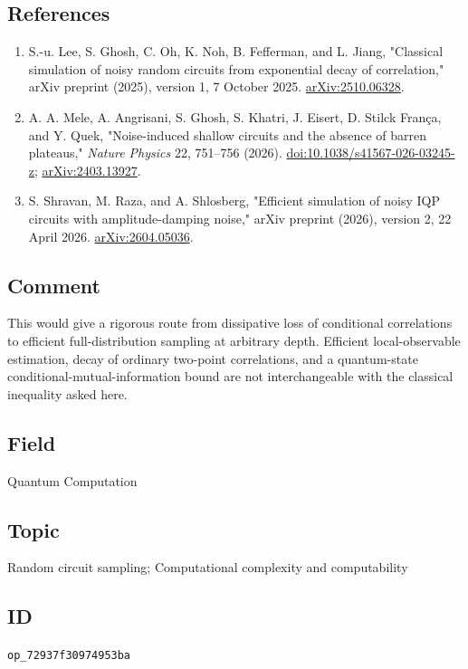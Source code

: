 \subsection*{References}

\begin{enumerate}[label={},leftmargin=4.8em,labelsep=0.5em]
  \footnotesize
  \item[\textup{[Lee25]}]\label{ref:7293-lee25}
  S.-u. Lee, S. Ghosh, C. Oh, K. Noh, B. Fefferman, and L. Jiang, "Classical simulation of noisy random circuits from exponential decay of correlation," arXiv preprint (2025), version 1, 7 October 2025. \href{https://arxiv.org/abs/2510.06328}{arXiv:2510.06328}.

  \item[\textup{[Mele26]}]\label{ref:7293-mele26}
  A. A. Mele, A. Angrisani, S. Ghosh, S. Khatri, J. Eisert, D. Stilck França, and Y. Quek, "Noise-induced shallow circuits and the absence of barren plateaus," \emph{Nature Physics} 22, 751–756 (2026). \href{https://doi.org/10.1038/s41567-026-03245-z}{doi:10.1038/s41567-026-03245-z}; \href{https://arxiv.org/abs/2403.13927}{arXiv:2403.13927}.

  \item[\textup{[Shravan26]}]\label{ref:7293-shravan26}
  S. Shravan, M. Raza, and A. Shlosberg, "Efficient simulation of noisy IQP circuits with amplitude-damping noise," arXiv preprint (2026), version 2, 22 April 2026. \href{https://arxiv.org/abs/2604.05036}{arXiv:2604.05036}.
\end{enumerate}

\subsection*{Comment}

This would give a rigorous route from dissipative loss of conditional correlations to efficient full-distribution sampling at arbitrary depth. Efficient local-observable estimation, decay of ordinary two-point correlations, and a quantum-state conditional-mutual-information bound are not interchangeable with the classical inequality asked here.

\subsection*{Field}

Quantum Computation

\subsection*{Topic}

Random circuit sampling; Computational complexity and computability

\subsection*{ID}

\texttt{op\_72937f30974953ba}
